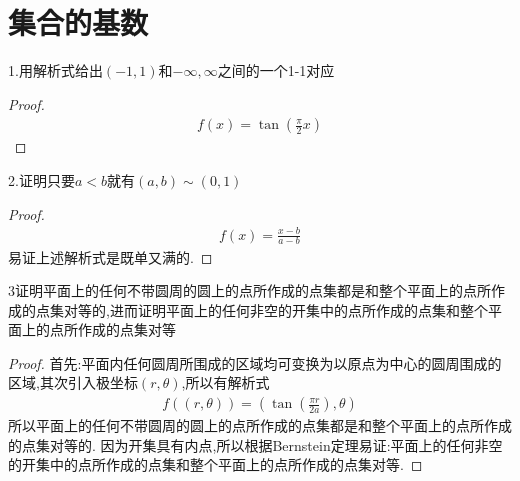 \section{集合的基数}
1.用解析式给出\((-1,1)\)和\(-\infty , \infty\)之间的一个1-1对应 
\begin{proof}
    \begin{align*}
        f(x) = \tan(\frac{\pi}{2}x)
    \end{align*}
\end{proof}
2.证明只要\(a < b \)就有\((a,b) \sim (0,1)\)
\begin{proof}
    \begin{align*}
        f(x)= \frac{x-b}{a-b}
    \end{align*}
    易证上述解析式是既单又满的.
\end{proof}
3证明平面上的任何不带圆周的圆上的点所作成的点集都是和整个平面上的点所作成的点集对等的,进而证明平面上的任何非空的开集中的点所作成的点集和整个平面上的点所作成的点集对等
\begin{proof}
    首先:平面内任何圆周所围成的区域均可变换为以原点为中心的圆周围成的区域,其次引入极坐标\((r, \theta)\),所以有解析式\begin{align*}
        f((r,\theta)) = (\tan(\frac{\pi r}{2a}), \theta)
    \end{align*}
    所以平面上的任何不带圆周的圆上的点所作成的点集都是和整个平面上的点所作成的点集对等的.
    因为开集具有内点,所以根据Bernstein定理易证:平面上的任何非空的开集中的点所作成的点集和整个平面上的点所作成的点集对等.
\end{proof}
